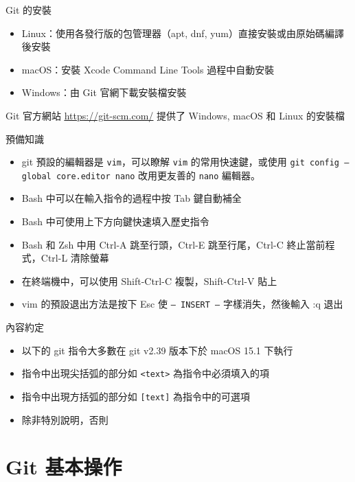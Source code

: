 \documentclass[xetex, unicode, 10pt, aspectratio=169]{beamer}
\begin{document}
\begin{frame}{Git 的安裝}
    \begin{itemize}
        \item Linux：使用各發行版的包管理器（apt, dnf, yum）直接安裝或由原始碼編譯後安裝
        \item macOS：安裝 Xcode Command Line Tools 過程中自動安裝
        \item Windows：由 Git 官網下載安裝檔安裝
    \end{itemize}

    Git 官方網站
    \underline{\href{https://git-scm.com/}{https://git-scm.com/}} 提供了
    Windows, macOS 和 Linux 的安裝檔
\end{frame}

\begin{frame}{預備知識}
    \begin{itemize}
        \item git 預設的編輯器是 \texttt{vim}，可以瞭解 \texttt{vim} 的常用快速鍵，或使用
            \texttt{git config --global core.editor nano} 改用更友善的 \texttt{nano} 編輯器。
        \item Bash 中可以在輸入指令的過程中按 Tab 鍵自動補全
        \item Bash 中可使用上下方向鍵快速填入歷史指令
        \item Bash 和 Zsh 中用 Ctrl-A 跳至行頭，Ctrl-E 跳至行尾，Ctrl-C 終止當前程式，Ctrl-L 清除螢幕
        \item 在終端機中，可以使用 Shift-Ctrl-C 複製，Shift-Ctrl-V 貼上
        \item vim 的預設退出方法是按下 Esc 使 \texttt{-- INSERT --} 字樣消失，然後輸入 :q 退出
    \end{itemize}
\end{frame}

\begin{frame}{內容約定}
    \begin{itemize}
        \item 以下的 git 指令大多數在 git v2.39 版本下於 macOS 15.1 下執行
        \item 指令中出現尖括弧的部分如 \texttt{<text>} 為指令中必須填入的項
        \item 指令中出現方括弧的部分如 \texttt{[text]} 為指令中的可選項
        \item 除非特別說明，否則
    \end{itemize}
\end{frame}

\section{Git 基本操作}
\end{document}

